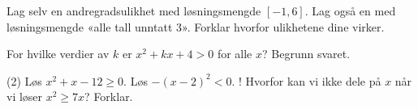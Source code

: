 Lag selv en andregradsulikhet med løsningsmengde $[-1, 6]$.
Lag også en med løsningsmengde «alle tall unntatt 3». Forklar hvorfor ulikhetene dine virker.

For hvilke verdier av $k$ er $x^2 + kx + 4 > 0$ for alle $x$? Begrunn svaret.

\begin{sjekk}
\begin{tasks}(2)
  \task Løs $x^2 + x - 12 \ge 0$.
  \task Løs $-(x - 2)^2 < 0$.
  \task! Hvorfor kan vi ikke dele på $x$ når vi løser $x^2 \ge 7x$? Forklar.
\end{tasks}
\end{sjekk}
